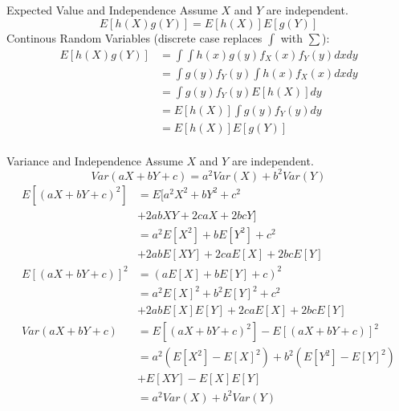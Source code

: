 \documentclass[t,handout]{beamer}
\begin{document}
\begin{frame}{Expected Value and Independence}
    Assume $X$ and $Y$ are independent.
    $$ E[h(X)g(Y)] = E[h(X)]E[g(Y)]$$
    Continous Random Variables (discrete case replaces $\int$ with $\sum$):
    {\small
    \begin{align*}
        E[h(X)g(Y)] & = \int \int  h(x)g(y) f_X(x) f_Y(y) dx dy \\
                    & = \int g(y) f_Y(y) \int h(x) f_X(x) dx dy \\
                    & = \int g(y) f_Y(y) E[h(X)] dy             \\
                    & = E[h(X)]\int g(y) f_Y(y)  dy             \\
                    & = E[h(X)]E[g(Y)]                          \\
    \end{align*}
    }
\end{frame}
\begin{frame}{Variance and Independence}
    Assume $X$ and $Y$ are independent.
    $$ Var(aX+bY+c) = a^2Var(X) + b^2Var(Y) $$
    {\small
            \begin{align*}
                E[(aX+bY+c)^2] & = E[a^2X^2 + bY^2 + c^2                     \\
                               & + 2abXY + 2caX + 2bcY]                      \\
                               & = a^2E[X^2] + bE[Y^2] + c^2                 \\
                               & + 2abE[XY] + 2caE[X] + 2bcE[Y]              \\
                E[(aX+bY+c)]^2 & = (aE[X]+bE[Y]+c)^2                         \\
                               & = a^2E[X]^2 + b^2E[Y]^2 + c^2               \\
                               & + 2abE[X]E[Y] + 2caE[X] + 2bcE[Y]           \\
                Var(aX+bY+c)   & = E[(aX+bY+c)^2] - E[(aX+bY+c)]^2           \\
                               & = a^2 (E[X^2]-E[X]^2) + b^2 (E[Y^2]-E[Y]^2) \\
                               & + E[XY] - E[X]E[Y]                          \\
                               & = a^2Var(X) + b^2Var(Y)                     \\
            \end{align*}
        }
\end{frame}
\end{document}
